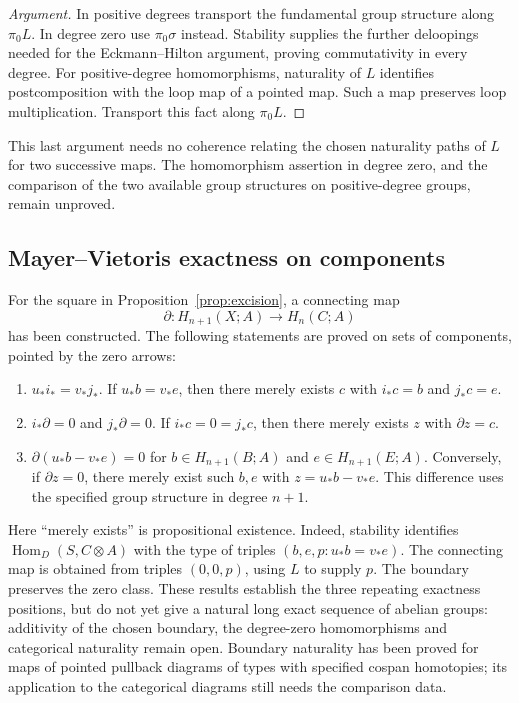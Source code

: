 \documentclass[11pt,a4paper]{amsart}
\theoremstyle{definition}
\newcommand{\Hom}{\operatorname{Hom}}
\begin{document}
\begin{proof}[Argument]
In positive degrees transport the fundamental group structure along
$\pi_0 L$. In degree zero use $\pi_0\sigma$ instead. Stability supplies
the further deloopings needed for the Eckmann--Hilton argument, proving
commutativity in every degree. For positive-degree homomorphisms,
naturality of $L$ identifies postcomposition with the loop map of a
pointed map. Such a map preserves loop multiplication. Transport this
fact along $\pi_0 L$.
\end{proof}

This last argument needs no coherence relating the chosen naturality
paths of $L$ for two successive maps. The homomorphism assertion in
degree zero, and the comparison of the two available group structures
on positive-degree groups, remain unproved.

\subsection*{Mayer--Vietoris exactness on components}
For the square in Proposition~\ref{prop:excision}, a connecting map
\[
 \partial:H_{n+1}(X;A)\longrightarrow H_n(C;A)
\]
has been constructed. The following statements are proved on sets of
components, pointed by the zero arrows:
\begin{enumerate}
 \item $u_*i_*=v_*j_*$. If $u_*b=v_*e$, then there merely exists $c$
 with $i_*c=b$ and $j_*c=e$.
 \item $i_*\partial=0$ and $j_*\partial=0$. If $i_*c=0=j_*c$, then
 there merely exists $z$ with $\partial z=c$.
 \item $\partial(u_*b-v_*e)=0$ for $b\in H_{n+1}(B;A)$ and
 $e\in H_{n+1}(E;A)$. Conversely, if $\partial z=0$, there merely
 exist such $b,e$ with $z=u_*b-v_*e$. This difference uses the specified
 group structure in degree $n+1$.
\end{enumerate}
Here ``merely exists'' is propositional existence. Indeed, stability
identifies $\Hom_D(S,C\otimes A)$ with the type of triples
$(b,e,p:u_*b=v_*e)$. The connecting map is obtained from triples
$(0,0,p)$, using $L$ to supply $p$.
The boundary preserves the zero class. These results establish the
three repeating exactness positions, but do not yet give a natural long
exact sequence of abelian groups: additivity of the chosen boundary,
the degree-zero homomorphisms and categorical naturality remain open.
Boundary naturality has been proved for maps of pointed pullback
diagrams of types with specified cospan homotopies; its application to
the categorical diagrams still needs the comparison data.
\end{document}
